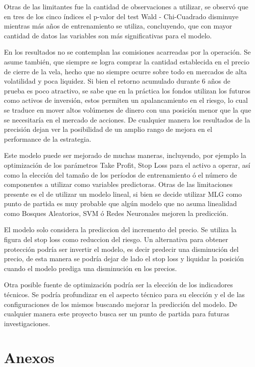 \documentclass[a4paper,12pt]{Latex/Classes/PhDthesisPSnPDF}
\begin{document}
Otras de las limitantes fue la cantidad de observaciones a utilizar, se observó que en tres de los cinco índices el p-valor del test Wald - Chi-Cuadrado disminuye mientras más años de entrenamiento se utiliza, concluyendo, que con mayor cantidad de datos las variables son más significativas para el modelo.

En los resultados no se contemplan las comisiones acarreadas por la operación. Se asume también, que siempre se logra comprar la cantidad establecida en el precio de cierre de la vela, hecho que no siempre ocurre sobre todo en mercados de alta volatilidad y poca liquidez. Si bien el retorno acumulado durante 6 años de prueba es poco atractivo, se sabe que en la práctica los fondos utilizan los futuros como activos de inversión, estos permiten un apalancamiento en el riesgo, lo cual se traduce en mover altos volúmenes de dinero con una posición menor que la que se necesitaría en el mercado de acciones. De cualquier manera los resultados de la precisión dejan ver la posibilidad de un amplio rango de mejora en el performance de la estrategia. 

Este modelo puede ser mejorado de muchas maneras, incluyendo, por ejemplo la optimización de los parámetros Take Profit, Stop Loss para el activo a operar, así como la elección del tamaño de los períodos de entrenamiento ó el número de componentes a utilizar como variables predictoras. Otras de las limitaciones presente es el de utilizar un modelo lineal, si bien se decide utilizar MLG como punto de partida es muy probable que algún modelo que no asuma linealidad como Bosques Aleatorios, SVM ó Redes Neuronales mejoren la predicción. 

El modelo solo considera la prediccion del incremento del precio. Se utiliza la figura del stop loss como reduccion del riesgo. Un alternativa para obtener protección podría ser invertir el modelo, es decir predecir una disminución del precio, de esta manera se podría dejar de lado el stop loss y liquidar la posición cuando el modelo prediga una disminución en los precios.

Otra posible fuente de optimización podría ser la elección de los indicadores técnicos. Se podría profundizar en el aspecto técnico para su elección y el de las configuraciones de los mismos buscando mejorar la predicción del modelo. De cualquier manera este proyecto busca ser un punto de partida para futuras investigaciones.



\chapter{Anexos}
\end{document}
